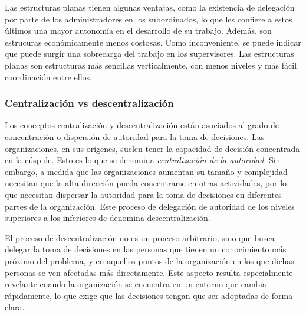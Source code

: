 \documentclass[12pt,a4paper,spanish]{report}
\begin{document}
				Las estructuras planas tienen algunas ventajas, como la existencia de delegación por parte de los administradores en los subordinados, lo que les confiere a estos últimos una mayor autonomía en el desarrollo de su trabajo. Además, son estrucuras económicamente menos costosas. Como inconveniente, se puede indicar que puede surgir una sobrecarga del trabajo en los supervisores. Las estructuras planas son estructuras más sencillas verticalmente, con menos niveles y más fácil coordinación entre ellos.

			\subsubsection{\textcolor[rgb]{0.5,0.1,0.4}Centralización vs descentralización}
				Los conceptos centralización y descentralización están asociados al grado de concentración o dispersión de autoridad para la toma de decisiones. Las organizaciones, en sus orígenes, suelen tener la capacidad de decisión concentrada en la cúspide. Esto es lo que se denomina \textcolor[rgb]{0.5,0.1,0.4}{\emph{centralización de la autoridad}}. Sin embargo, a medida que las organizaciones aumentan su tamaño y complejidad necesitan que la alta dirección pueda concentrarse en otras actividades, por lo que necesitan dispersar la autoridad para la toma de decisiones en diferentes partes de la organización. Este proceso de delegación de autoridad de los niveles superiores a los inferiores de denomina descentralización.

				El proceso de descentralización no es un proceso arbitrario, sino que busca delegar la toma de decisiones en las personas que tienen un conocimiento más próximo del problema, y en aquellos puntos de la organización en los que dichas personas se ven afectadas más directamente. Este aspecto resulta especialmente revelante cuando la organización se encuentra en un entorno que cambia rápidamente, lo que exige que las decisiones tengan que ser adoptadas de forma clara.
\end{document}
